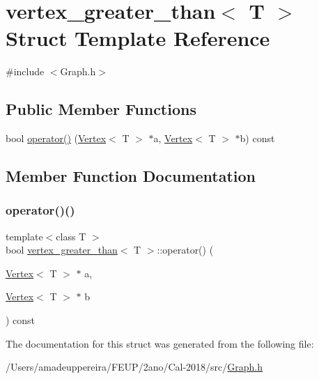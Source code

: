 \hypertarget{structvertex__greater__than}{}\section{vertex\+\_\+greater\+\_\+than$<$ T $>$ Struct Template Reference}
\label{structvertex__greater__than}


{\ttfamily \#include $<$Graph.\+h$>$}

\subsection*{Public Member Functions}
\begin{DoxyCompactItemize}
\item 
bool \mbox{\hyperlink{structvertex__greater__than_acb041eee618f7d56a3685c7aaf347df6}{operator()}} (\mbox{\hyperlink{class_vertex}{Vertex}}$<$ T $>$ $\ast$a, \mbox{\hyperlink{class_vertex}{Vertex}}$<$ T $>$ $\ast$b) const
\end{DoxyCompactItemize}


\subsection{Member Function Documentation}
\mbox{\label{structvertex__greater__than_acb041eee618f7d56a3685c7aaf347df6}} 
\subsubsection{\texorpdfstring{operator()()}{operator()()}}
{\footnotesize\ttfamily template$<$class T $>$ \\
bool \mbox{\hyperlink{structvertex__greater__than}{vertex\+\_\+greater\+\_\+than}}$<$ T $>$\+::operator() (\begin{DoxyParamCaption}\item[{\mbox{\hyperlink{class_vertex}{Vertex}}$<$ T $>$ $\ast$}]{a,  }\item[{\mbox{\hyperlink{class_vertex}{Vertex}}$<$ T $>$ $\ast$}]{b }\end{DoxyParamCaption}) const\hspace{0.3cm}{\ttfamily [inline]}}



The documentation for this struct was generated from the following file\+:\begin{DoxyCompactItemize}
\item 
/\+Users/amadeuppereira/\+F\+E\+U\+P/2ano/\+Cal-\/2018/src/\mbox{\hyperlink{_graph_8h}{Graph.\+h}}\end{DoxyCompactItemize}

